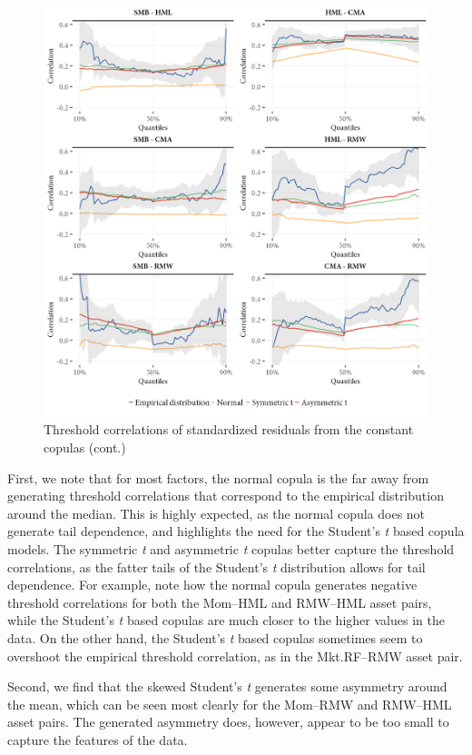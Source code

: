 \begin{figure}[!ht]
  \ContinuedFloat
  \centering
  \caption{Threshold correlations of standardized residuals from the constant copulas (cont.)}
  \includegraphics[scale=1]{graphics/threshold_simulated_2.png}  
\end{figure}

First, we note that for most factors, the normal copula is the far away from generating threshold correlations that correspond to the empirical distribution around the median. This is highly expected, as the normal copula does not generate tail dependence, and highlights the need for the Student's \textit{t} based copula models. The symmetric \textit{t} and asymmetric \textit{t} copulas better capture the threshold correlations, as the fatter tails of the Student's \textit{t} distribution allows for tail dependence. For example, note how the normal copula generates negative threshold correlations for both the Mom--HML and RMW--HML asset pairs, while the Student's \textit{t} based copulas are much closer to the higher values in the data. On the other hand, the Student's \textit{t} based copulas sometimes seem to overshoot the empirical threshold correlation, as in the Mkt.RF--RMW asset pair.

Second, we find that the skewed Student's \textit{t} generates some asymmetry around the mean, which can be seen most clearly for the Mom--RMW and RMW--HML asset pairs. The generated asymmetry does, however, appear to be too small to capture the features of the data.

